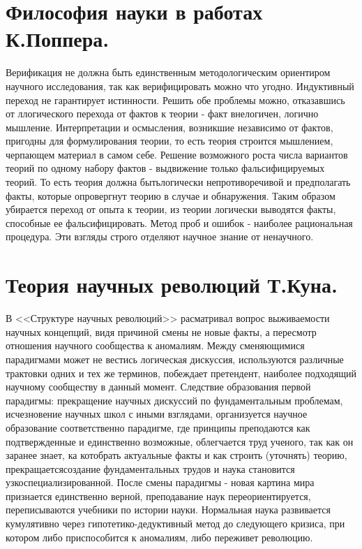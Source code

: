 \documentclass[12pt, specialist, subf, substylefile = spbu.rtx]{disser}
\begin{document}
\section{Философия науки в работах К.Поппера.}
Верификация не должна быть единственным методологическим ориентиром научного исследования, так как верифицировать можно что угодно. Индуктивный переход не гарантирует истинности. Решить обе проблемы можно, отказавшись от ллогического перехода от фактов к теории - факт внелогичен, логично мышление. Интерпретации и осмысления, возникшие независимо от фактов, пригодны для формулирования теории, то есть теория строится мышлением, черпающем материал в самом себе. Решение возможного роста числа вариантов теорий по одному набору фактов - выдвижение только фальсифицируемых теорий. То есть теория должна бытьлогически непротиворечивой и предполагать факты, которые опровергнут теорию в случае и обнаружения. Таким образом убирается переход от опыта к теории, из теории логически выводятся факты, способные ее фальсифицировать. Метод проб и ошибок - наиболее рациональная процедура. Эти взгляды строго отделяют научное знание от ненаучного.

\section{Теория научных революций Т.Куна.}
В <<Структуре научных революций>> расматривал вопрос выживаемости научных концепций, видя причиной смены не новые факты, а пересмотр отношения научного сообщества к аномалиям. Между сменяющимися парадигмами может не вестись логическая дискуссия, используются различные трактовки одних и тех же терминов, побеждает претендент, наиболее подходящий научному сообществу в данный момент. 
Следствие образования первой парадигмы: прекращение научных дискуссий по фундаментальным проблемам, исчезновение научных школ с иными взглядами, организуется научное образование соответственно парадигме, где принципы преподаются как подтвержденные и единственно возможные, облегчается труд ученого, так как он заранее знает, ка котобрать актуальные факты и как строить (уточнять) теорию, прекращаетсясоздание фундаментальных трудов и наука становится узкоспециализированной.
После смены парадигмы - новая картина мира признается единственно верной, преподавание наук переориентируется, переписываются учебники по истории науки.
Нормальная наука развивается кумулятивно через гипотетико-дедуктивный метод до следующего кризиса, при котором либо приспособится к аномалиям, либо переживет революцию.
\end{document}
